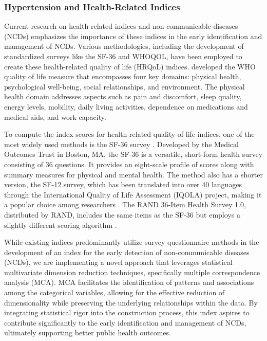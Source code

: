 \documentclass[
  12pt,
  a4paper]{article}
\begin{document}
\subsubsection{Hypertension and Health-Related Indices}\label{hypertension-and-health-related-indices}

Current research on health-related indices and non-communicable diseases (NCDs) emphasizes the importance of these indices in the early identification and management of NCDs. Various methodologies, including the development of standardized surveys like the SF-36 and WHOQOL, have been employed to create these health-related quality of life (HRQoL) indices. \citet{whoqol1998development} developed the WHO quality of life measure that encompasses four key domains: physical health, psychological well-being, social relationships, and environment. The physical health domain addresses aspects such as pain and discomfort, sleep quality, energy levels, mobility, daily living activities, dependence on medications and medical aids, and work capacity.

To compute the index scores for health-related quality-of-life indices, one of the most widely used methods is the SF-36 survey \citep{ware1993sf}. Developed by the Medical Outcomes Trust in Boston, MA, the SF-36 is a versatile, short-form health survey consisting of 36 questions. It provides an eight-scale profile of scores along with summary measures for physical and mental health. The method also has a shorter version, the SF-12 survey, which has been translated into over 40 languages through the International Quality of Life Assessment (IQOLA) project, making it a popular choice among researchers \citep{ware199612}. The RAND 36-Item Health Survey 1.0, distributed by RAND, includes the same items as the SF-36 but employs a slightly different scoring algorithm \citep{hays1993rand}.

While existing indices predominantly utilize survey questionnaire methods in the development of an index for the early detection of non-communicable diseases (NCDs), we are implementing a novel approach that leverages statistical multivariate dimension reduction techniques, specifically multiple correspondence analysis (MCA). MCA facilitates the identification of patterns and associations among the categorical variables, allowing for the effective reduction of dimensionality while preserving the underlying relationships within the data. By integrating statistical rigor into the construction process, this index aspires to contribute significantly to the early identification and management of NCDs, ultimately supporting better public health outcomes.
\end{document}
